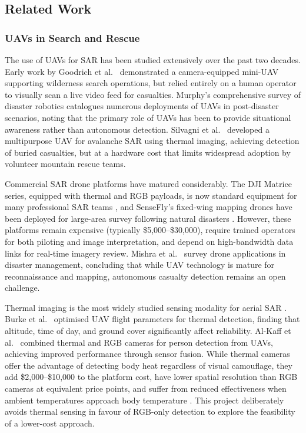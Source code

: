 \subsection{Related Work}\label{sec:related-work}

\subsubsection{UAVs in Search and Rescue}

The use of UAVs for SAR has been studied extensively over the past two decades. Early work by Goodrich et al.\ \cite{goodrich2008} demonstrated a camera-equipped mini-UAV supporting wilderness search operations, but relied entirely on a human operator to visually scan a live video feed for casualties. Murphy's comprehensive survey of disaster robotics \cite{murphy2014} catalogues numerous deployments of UAVs in post-disaster scenarios, noting that the primary role of UAVs has been to provide situational awareness rather than autonomous detection. Silvagni et al.\ \cite{sarreview} developed a multipurpose UAV for avalanche SAR using thermal imaging, achieving detection of buried casualties, but at a hardware cost that limits widespread adoption by volunteer mountain rescue teams.

Commercial SAR drone platforms have matured considerably. The DJI Matrice series, equipped with thermal and RGB payloads, is now standard equipment for many professional SAR teams \cite{dji_matrice}, and SenseFly's fixed-wing mapping drones have been deployed for large-area survey following natural disasters \cite{sensefly_sar}. However, these platforms remain expensive (typically \$5{,}000--\$30{,}000), require trained operators for both piloting and image interpretation, and depend on high-bandwidth data links for real-time imagery review. Mishra et al.\ \cite{mishra2020} survey drone applications in disaster management, concluding that while UAV technology is mature for reconnaissance and mapping, autonomous casualty detection remains an open challenge.

Thermal imaging is the most widely studied sensing modality for aerial SAR \cite{thermal_sar, thermal_review}. Burke et al.\ \cite{thermal_sar} optimised UAV flight parameters for thermal detection, finding that altitude, time of day, and ground cover significantly affect reliability. Al-Kaff et al.\ \cite{alkaff2019} combined thermal and RGB cameras for person detection from UAVs, achieving improved performance through sensor fusion. While thermal cameras offer the advantage of detecting body heat regardless of visual camouflage, they add \$2{,}000--\$10{,}000 to the platform cost, have lower spatial resolution than RGB cameras at equivalent price points, and suffer from reduced effectiveness when ambient temperatures approach body temperature \cite{thermal_review}. This project deliberately avoids thermal sensing in favour of RGB-only detection to explore the feasibility of a lower-cost approach.

